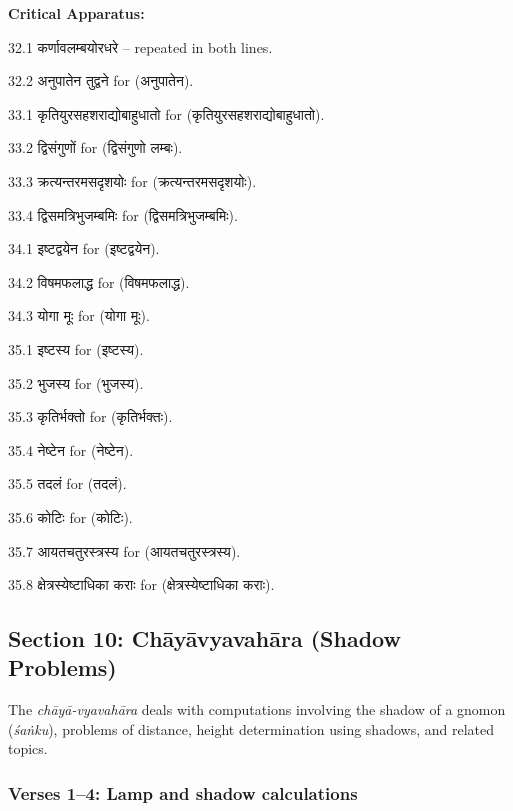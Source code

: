\documentclass[11pt,a4paper]{article}
\newcommand{\dev}[1]{{\devanagarifont #1}}
\newenvironment{variants}{%
  \small%
  \color{varecolor}%
  \list{}{\leftmargin=2em\itemindent=-1em}%
}{\endlist}
\begin{document}
\textcolor{varecolor}{\textbf{Critical Apparatus:}}
\begin{variants}
\item[32.1] \dev{कर्णावलम्बयोरधरे} -- repeated in both lines.
\item[32.2] \dev{अनुपातेन तुद्वने} \dev{for} (\dev{अनुपातेन}).
\item[33.1] \dev{कृतियुरसहशराद्योबाहुधातो} \dev{for} (\dev{कृतियुरसहशराद्योबाहुधातो}).
\item[33.2] \dev{द्विसंगुणों} \dev{for} (\dev{द्विसंगुणो लम्बः}).
\item[33.3] \dev{क्रत्यन्तरमसदृशयोः} \dev{for} (\dev{क्रत्यन्तरमसदृशयोः}).
\item[33.4] \dev{द्विसमत्रिभुजम्बमिः} \dev{for} (\dev{द्विसमत्रिभुजम्बमिः}).
\item[34.1] \dev{इष्टद्वयेन} \dev{for} (\dev{इष्टद्वयेन}).
\item[34.2] \dev{विषमफलाद्ध} \dev{for} (\dev{विषमफलाद्ध}).
\item[34.3] \dev{योगा मूः} \dev{for} (\dev{योगा मूः}).
\item[35.1] \dev{इष्टस्य} \dev{for} (\dev{इष्टस्य}).
\item[35.2] \dev{भुजस्य} \dev{for} (\dev{भुजस्य}).
\item[35.3] \dev{कृतिर्भक्तो} \dev{for} (\dev{कृतिर्भक्तः}).
\item[35.4] \dev{नेष्टेन} \dev{for} (\dev{नेष्टेन}).
\item[35.5] \dev{तदलं} \dev{for} (\dev{तदलं}).
\item[35.6] \dev{कोटिः} \dev{for} (\dev{कोटिः}).
\item[35.7] \dev{आयतचतुरस्त्रस्य} \dev{for} (\dev{आयतचतुरस्त्रस्य}).
\item[35.8] \dev{क्षेत्रस्येष्टाधिका कराः} \dev{for} (\dev{क्षेत्रस्येष्टाधिका कराः}).
\end{variants}

\subsection*{Section 10: Chāyāvyavahāra (Shadow Problems)}

The \textit{chāyā-vyavahāra} deals with computations involving the shadow of a gnomon 
(\textit{śaṅku}), problems of distance, height determination using shadows, and 
related topics.

\subsubsection*{Verses 1--4: Lamp and shadow calculations}
\end{document}
